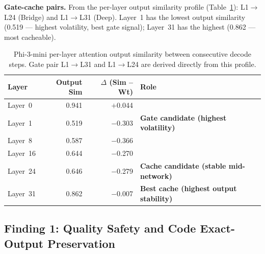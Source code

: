 \documentclass{article}
\begin{document}
\textbf{Gate-cache pairs.} From the per-layer output similarity profile
(Table~\ref{tab:phi3-layer-sim}): L1$\to$L24 (Bridge) and L1$\to$L31
(Deep). Layer~1 has the lowest output similarity (0.519 --- highest
volatility, best gate signal); Layer~31 has the highest (0.862 --- most
cacheable).

\begin{table}[htbp]
\centering
\setlength{\tabcolsep}{5pt}
\renewcommand{\arraystretch}{1.10}
\begin{tabular}{lrrl}
\toprule
\textbf{Layer} & \textbf{Output Sim} & \textbf{$\Delta$ (Sim -- Wt)} & \textbf{Role} \\
\midrule
Layer~0  & 0.941 & $+$0.044 & \\
Layer~1  & 0.519 & $-$0.303 & \textbf{Gate candidate (highest volatility)} \\
Layer~8  & 0.587 & $-$0.366 & \\
Layer~16 & 0.644 & $-$0.270 & \\
Layer~24 & 0.646 & $-$0.279 & \textbf{Cache candidate (stable mid-network)} \\
Layer~31 & 0.862 & $-$0.007 & \textbf{Best cache (highest output stability)} \\
\bottomrule
\end{tabular}
\caption{Phi-3-mini per-layer attention output similarity between
consecutive decode steps. Gate pair L1$\to$L31 and L1$\to$L24 are
derived directly from this profile.}
\label{tab:phi3-layer-sim}
\end{table}

\subsection{Finding 1: Quality Safety and Code Exact-Output Preservation}
\label{sec:llm-ppl-safety}
\end{document}
